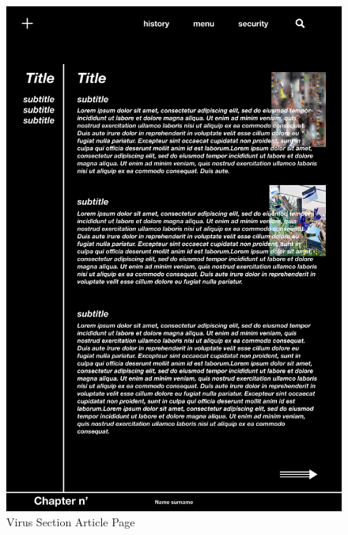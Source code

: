 \documentclass[a4paper,10pt]{article}
\begin{document}
\begin{figure}[p]
\includegraphics[height=0.52\paperheight, center]{virus_article.jpeg}
\caption{Virus Section Article Page}
\end{figure}
\end{document}

